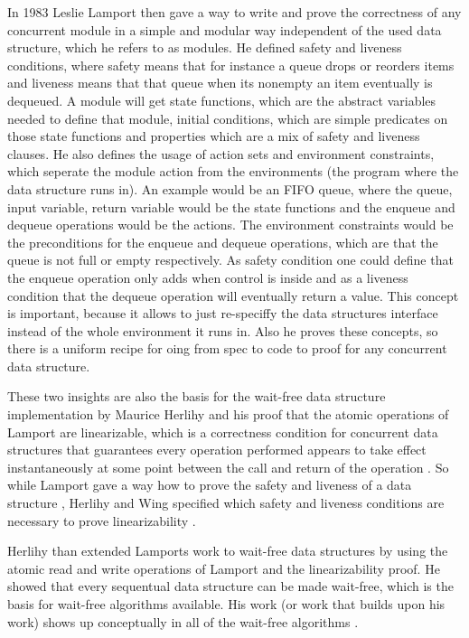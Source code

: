 In 1983 Leslie Lamport then gave a way to write and prove the correctness of any concurrent module in a simple and modular way independent of the used data structure, which he refers to as modules. He defined safety and liveness conditions, where safety means that for instance a queue drops or reorders items and liveness means that that queue when its nonempty an item eventually is dequeued. A module will get state functions, which are the abstract variables needed to define that module, initial conditions, which are simple predicates on those state functions and properties which are a mix of safety and liveness clauses. He also defines the usage of action sets and environment constraints, which seperate the module action from the environments (the program where the data structure runs in). An example would be an \ac{FIFO} queue, where the queue, input variable, return variable would be the state functions and the enqueue and dequeue operations would be the actions. The environment constraints would be the preconditions for the enqueue and dequeue operations, which are that the queue is not full or empty respectively. As safety condition one could define that the enqueue operation only adds when control is inside and as a liveness condition that the dequeue operation will eventually return a value. This concept is important, because it allows to just re-speciffy the data structures interface instead of the whole environment it runs in. Also he proves these concepts, so there is a uniform recipe for oing from spec to code to proof for any concurrent data structure. \cite{Lamport1983SPSCCircularBuffer}

These two insights are also the basis for the wait-free data structure implementation by Maurice Herlihy and his proof that the atomic operations of Lamport are linearizable, which is a correctness condition for concurrent data structures that guarantees every operation performed appears to take effect instantaneously at some point between the call and return of the operation \cite{herlihy1991wait,HerlihyLinearizability}. So while Lamport gave a way how to prove the safety and liveness of a data structure \cite{Lamport1983SPSCCircularBuffer}, Herlihy and Wing specified which safety and liveness conditions are necessary to prove linearizability \cite{HerlihyLinearizability}. 

Herlihy than extended Lamports work to wait-free data structures by using the atomic read and write operations of Lamport and the linearizability proof. He showed that every sequentual data structure can be made wait-free, which is the basis for wait-free algorithms available. His work (or work that builds upon his work) shows up conceptually in all of the wait-free algorithms \cite{naderibeni2023waitfreequeuepolylogarithmicstep,kogan2012methodology,wCQWaitFreeQueue,WaitFreeQueueWithWaitFreeMemoryReclamation,Kogan2011WaitFreeQueues,FastFetchAndAddWaitFreeQueue}. \cite{herlihy1991wait}